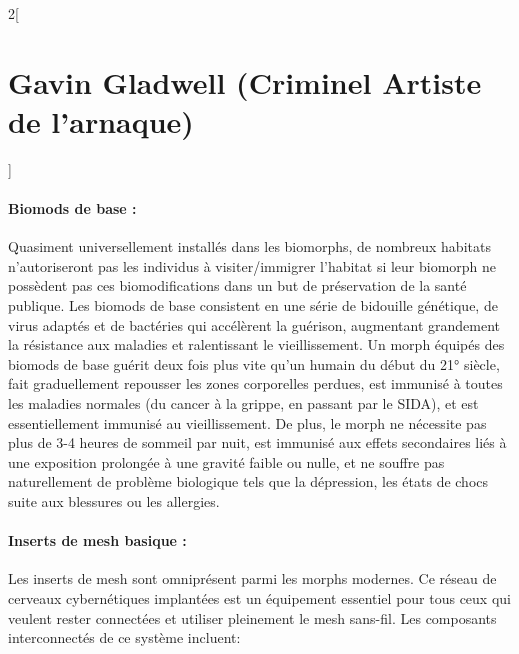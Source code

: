 \documentclass[a4paper,9pt]{article}
\begin{document}
\begin{multicols}{2}[\section*{Gavin Gladwell (Criminel Artiste de l'arnaque)}]
   \paragraph{Biomods de base :} 
   Quasiment universellement  installés dans les biomorphs, de nombreux habitats
   n'autoriseront pas les individus à visiter/immigrer l'habitat si leur biomorph
   ne possèdent pas ces biomodifications dans un but de préservation de la santé
   publique. Les biomods de base consistent en une série de bidouille génétique,
   de virus adaptés et de bactéries qui accélèrent la guérison, augmentant
   grandement la résistance aux maladies et ralentissant le vieillissement. Un
   morph équipés des biomods de base guérit deux fois plus vite qu'un humain du
   début du 21° siècle, fait graduellement repousser les zones corporelles
   perdues, est immunisé à toutes les maladies normales (du cancer à la grippe, en
   passant par le SIDA), et est essentiellement immunisé au vieillissement. De
   plus, le morph ne nécessite pas plus de 3-4 heures de sommeil par nuit, est
   immunisé aux effets secondaires liés à une exposition prolongée à une gravité
   faible ou nulle, et ne souffre pas naturellement de problème biologique tels
   que la dépression, les états de chocs suite aux blessures ou les allergies.

   \paragraph{Inserts de mesh basique :} 
   Les inserts de mesh sont omniprésent parmi les morphs modernes. Ce réseau de
   cerveaux cybernétiques implantées est un équipement essentiel pour tous ceux
   qui veulent rester connectées et utiliser pleinement le mesh sans-fil. Les
   composants interconnectés de ce système incluent: 


\end{multicols}
\end{document}
